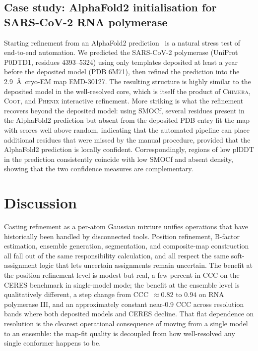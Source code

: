 \documentclass[11pt]{article}
\begin{document}
\subsection{Case study: AlphaFold2 initialisation for SARS-CoV-2 RNA polymerase}
Starting refinement from an AlphaFold2 prediction~\cite{jumper2021} is a natural stress test of end-to-end automation. We predicted the SARS-CoV-2 polymerase (UniProt P0DTD1, residues 4393--5324) using only templates deposited at least a year before the deposited model (PDB 6M71), then refined the prediction into the 2.9~\AA\ cryo-EM map EMD-30127. The resulting structure is highly similar to the deposited model in the well-resolved core, which is itself the product of \textsc{Chimera}, \textsc{Coot}, and \textsc{Phenix} interactive refinement. More striking is what the refinement recovers beyond the deposited model: using SMOCf, several residues present in the AlphaFold2 prediction but absent from the deposited PDB entry fit the map with scores well above random, indicating that the automated pipeline can place additional residues that were missed by the manual procedure, provided that the AlphaFold2 prediction is locally confident. Correspondingly, regions of low plDDT in the prediction consistently coincide with low SMOCf and absent density, showing that the two confidence measures are complementary.

\section{Discussion}

Casting refinement as a per-atom Gaussian mixture unifies operations that have historically been handled by disconnected tools. Position refinement, B-factor estimation, ensemble generation, segmentation, and composite-map construction all fall out of the same responsibility calculation, and all respect the same soft-assignment logic that lets uncertain assignments remain uncertain. The benefit at the position-refinement level is modest but real, a few percent in CCC on the CERES benchmark in single-model mode; the benefit at the ensemble level is qualitatively different, a step change from CCC~$\approx 0.82$ to $0.94$ on RNA polymerase III, and an approximately constant near-0.9 CCC across resolution bands where both deposited models and CERES decline. That flat dependence on resolution is the clearest operational consequence of moving from a single model to an ensemble: the map-fit quality is decoupled from how well-resolved any single conformer happens to be.
\end{document}
